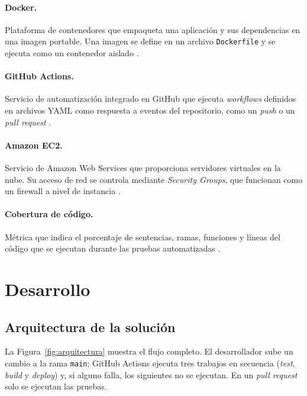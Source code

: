 \documentclass[12pt,letterpaper]{article}
\begin{document}
\paragraph{Docker.} Plataforma de contenedores que empaqueta una aplicación y sus dependencias en una imagen portable. Una imagen se define en un archivo \texttt{Dockerfile} y se ejecuta como un contenedor aislado \cite{merkel,dockerdocs}.

\paragraph{GitHub Actions.} Servicio de automatización integrado en GitHub que ejecuta \emph{workflows} definidos en archivos YAML como respuesta a eventos del repositorio, como un \emph{push} o un \emph{pull request} \cite{githubactions}.

\paragraph{Amazon EC2.} Servicio de Amazon Web Services que proporciona servidores virtuales en la nube. Su acceso de red se controla mediante \emph{Security Groups}, que funcionan como un firewall a nivel de instancia \cite{awsec2}.

\paragraph{Cobertura de código.} Métrica que indica el porcentaje de sentencias, ramas, funciones y líneas del código que se ejecutan durante las pruebas automatizadas \cite{jest}.

\section{Desarrollo}

\subsection{Arquitectura de la solución}

La Figura~\ref{fig:arquitectura} muestra el flujo completo. El desarrollador sube un cambio a la rama \texttt{main}; GitHub Actions ejecuta tres trabajos en secuencia (\emph{test}, \emph{build} y \emph{deploy}) y, si alguno falla, los siguientes no se ejecutan. En un \emph{pull request} solo se ejecutan las pruebas.
\end{document}
